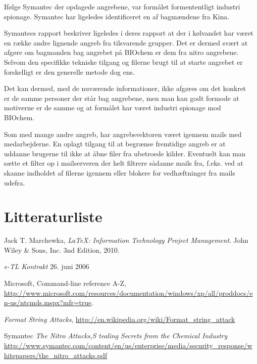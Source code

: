 \documentclass[10pt,a4paper,danish]{article}
\begin{document}
Ifølge Symantec der opdagede angrebene, var formålet formententligt industri
spionage. Symantec har ligeledes identificeret en af bagmændene fra Kina.

Symantecs rapport\cite{nitro-article} beskriver ligeledes i deres rapport at der i kølvandet har været en
række andre lignende angreb fra tilsvarende grupper. Det er dermed svært at
afgøre om bagmanden bag angrebet på BIOchem er dem fra nitro angrebene.
Selvom den specifikke tekniske tilgang og filerne brugt til at starte angrebet
er forskelligt er den generelle metode dog ens.

Det kan dermed, med de nuværende informationer, ikke afgøres om det konkret er
de samme personer der står bag angrebene, men man kan godt formode at motiverne
er de samme og at formålet har været industri spionage mod BIOchem.


Som med mange andre angreb, har angrebsvektoren været igennem mails med
medarbejderne.
En oplagt tilgang til at begrænse fremtidige angreb er at uddanne brugerne til
ikke at åbne filer fra ubetroede kilder.
Eventuelt kan man sætte et filter op i mailserveren der helt filtrere sådanne
mails fra, f.eks. ved at skanne indholdet af filerne igennem eller blokere for
vedhæftninger fra mails udefra.



\section{Litteraturliste}

\begin{thebibliography}{9}
 Jack T. Marchewka, \textit{\LaTeX: Information Technology
    Project Management}.  John Wiley \& Sons, Inc.  3nd Edition, 2010.

 \textit{e-TL Kontrakt} 26. juni 2006

 Microsoft, Command-line reference A-Z,
  \url{http://www.microsoft.com/resources/documentation/windows/xp/all/proddocs/en-us/ntcmds.mspx?mfr=true}.

 \textit{Format String Attacks},
  \url{http://en.wikipedia.org/wiki/Format_string_attack}

 Symantec \textit{The Nitro Attacks,S
tealing Secrets from the Chemical Industry} \url{http://www.symantec.com/content/en/us/enterprise/media/security_response/whitepapers/the_nitro_attacks.pdf}

\end{thebibliography}
\end{document}
